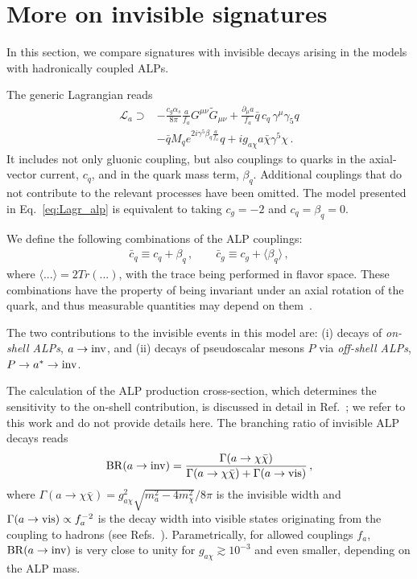 \documentclass[aps,prd,preprintnumbers,superscriptaddress,nofootinbib,floatfix,twocolumn,notitlepage,reprint]{revtex4-2}
\newcommand{\inv}{{\rm inv}}
\newcommand{\BR}{\mathrm{BR}}
\begin{document}
\section{More on invisible signatures}
\label{app:meson-to-invis}

In this section, we compare signatures with invisible decays arising in the models with hadronically coupled ALPs.

The generic Lagrangian reads
%
\begin{align}
    \label{eq:ALP-model-SuM}
	\mathcal L_a 
    \supset 
    &-\frac{c_g\alpha_s}{8\pi } \frac{ a }{f_a} G^{\mu\nu} \tilde{G}_{ \mu \nu} 
	+\frac{\partial_\mu a}{f_a} \bar{q} \, c_q\, \gamma^\mu\gamma_5 q \nonumber\\
    &-\bar{q} M_qe^{2i\gamma^5\beta_q \frac{a}{f_a}} q+ ig_{a\chi}a\bar \chi \gamma^{5}\chi \,.
\end{align}
%
It includes not only gluonic coupling, but also couplings to quarks in the axial-vector current, $c_{q}$, and in the quark mass term, $\beta_{q}$.
Additional couplings that do not contribute to the relevant processes have been omitted.
The model presented in Eq.~\eqref{eq:Lagr_alp} is equivalent to taking $c_g=-2$ and $c_q=\beta_q=0$.

We define the following combinations of the ALP couplings:
%
\begin{align}
    \label{eq:ALP-invariant-couplings}
	\bar{c}_q\equiv c_q+\beta_q\,,\qquad 
    \bar{c}_g\equiv c_g+\langle \beta_q\rangle  \,,
\end{align}
%
where $\langle...\rangle=2Tr(...)$, with the trace being performed in flavor space.
These combinations have the property of being invariant under an axial rotation of the quark, and thus measurable quantities may depend on them~\cite{Balkin:2025enj}. 

The two contributions to the invisible events in this model are: 
(i) decays of \emph{on-shell ALPs}, $a\to \inv$, 
and (ii) decays of pseudoscalar mesons $P$ via \emph{off-shell ALPs}, $P\to a^{*}\to \inv$.

The calculation of the ALP production cross-section, which determines the sensitivity to the on-shell contribution, is discussed in detail in Ref.~\cite{Balkin:2026whv}; 
we refer to this work and do not provide details here. 
The branching ratio of invisible ALP decays reads
%
\begin{align}
    \label{eq:ALP-inv}
    \BR(a\to\inv) 
    = \frac{\Gamma(a\to\chi\bar{\chi})}{\Gamma(a\to\chi\bar{\chi})+\Gamma(a\to{\rm vis})}\,,
\end{align}
%
where $\Gamma(a\to\chi\bar{\chi}) = g_{a\chi}^{2}\sqrt{m_{a}^{2}-4m_{\chi}^{2}}/8\pi$ is the invisible width and $\Gamma(a\to{\rm vis})\propto f_{a}^{-2}$ is the decay width into visible states originating from the coupling to hadrons (see Refs.~\cite{Ovchynnikov:2025gpx,Balkin:2025enj}). 
Parametrically, for allowed couplings $f_{a}$, $\BR(a\to\inv)$ is very close to unity for $g_{a\chi}\gtrsim 10^{-3}$ and even smaller, depending on the ALP mass.
 
\end{document}
